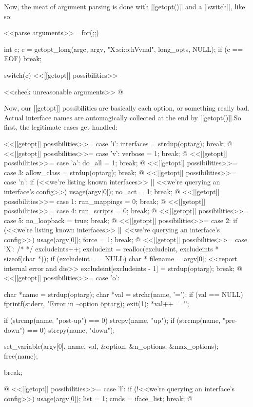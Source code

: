 \documentclass{article}
\begin{document}
Now, the meat of argument parsing is done with [[getopt()]] and a
[[switch]], like so:

<<parse arguments>>=
for(;;) {
	int c;
	c = getopt_long(argc, argv, "X:s:i:o:hVvnal", long_opts, NULL);
	if (c == EOF) break;

	switch(c) {
		<<[[getopt]] possibilities>>
	}
}

<<check unreasonable arguments>>
@ 

Now, our [[getopt]] possibilities are basically each option, or something
really bad. Actual interface names are automagically collected at the end
by [[getopt()]].So first, the legitimate cases get handled:

<<[[getopt]] possibilities>>=
case 'i':
	interfaces = strdup(optarg);
	break;
@ 
<<[[getopt]] possibilities>>=
case 'v':
	verbose = 1;
	break;
@ 
<<[[getopt]] possibilities>>=
case 'a':
	do_all = 1;
	break;
@ 
<<[[getopt]] possibilities>>=
case 3:
	allow_class = strdup(optarg);
	break;
@ 
<<[[getopt]] possibilities>>=
case 'n':
        if (<<we're listing known interfaces>> || <<we're querying an interface's config>>)
		usage(argv[0]);
	no_act = 1;
	break;
@ 
<<[[getopt]] possibilities>>=
case 1:
	run_mappings = 0;
	break;
@ 
<<[[getopt]] possibilities>>=
case 4:
	run_scripts = 0;
	break;
@ 
<<[[getopt]] possibilities>>=
case 5:
	no_loopback = true;
	break;
@ 
<<[[getopt]] possibilities>>=
case 2:
        if (<<we're listing known interfaces>> || <<we're querying an interface's config>>)
		usage(argv[0]);
	force = 1;
	break;
@
<<[[getopt]] possibilities>>=
case 'X':
	/* */
	excludeints++;
	excludeint = realloc(excludeint, excludeints * sizeof(char *));
	if (excludeint == NULL) {
		char * filename = argv[0];
		<<report internal error and die>>
	}
	excludeint[excludeints - 1] = strdup(optarg);
	break;
@ 
<<[[getopt]] possibilities>>=
case 'o':
{
	char *name = strdup(optarg);
	char *val = strchr(name, '=');
	if (val == NULL) {
		fprintf(stderr, "Error in --option \"%
			optarg);
		exit(1);
	}
	*val++ = '\0';

	if (strcmp(name, "post-up") == 0) {
		strcpy(name, "up");
	}
	if (strcmp(name, "pre-down") == 0) {
		strcpy(name, "down");
	}
	
	set_variable(argv[0], name, val, &option, &n_options, &max_options);
	free(name);

	break;
}
@ 
<<[[getopt]] possibilities>>=
case 'l':
        if (!<<we're querying an interface's config>>)
		usage(argv[0]);
	list = 1;
	cmds = iface_list;
	break;
@ 
\end{document}

